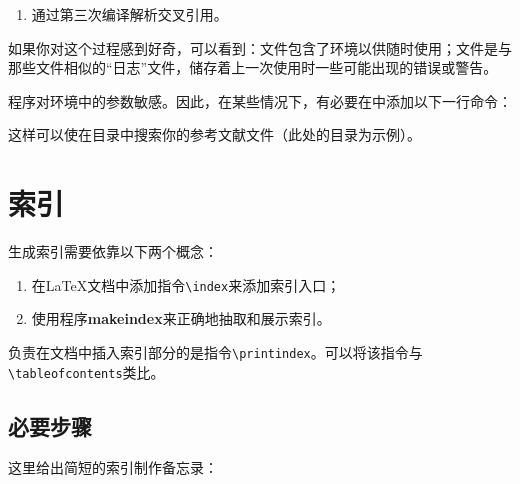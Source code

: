 \begin{enumerate}

    \item 通过第三次编译解析交叉引用。
\end{enumerate}

如果你对这个过程感到好奇，可以看到：文件包含了环境以供随时使用；文件是与那些文件相似的“日志”文件，储存着上一次使用\bib 时一些可能出现的错误或警告。

\begin{exclamation}
程序\bib 对环境中的参数敏感。因此，在某些情况下，有必要在\linebreak{}中添加以下一行命令：


这样可以使\bib 在目录中搜索你的参考文献文件（此处的目录为示例）。
\end{exclamation}

\section{索引}

生成索引需要依靠以下两个概念：

\begin{enumerate}
    \item 在\LaTeX 文档中添加指令\verb|\index|来添加索引入口；
    \item 使用程序\textbf{makeindex}来正确地抽取和展示索引。
\end{enumerate}

负责在文档中插入索引部分的是指令\verb|\printindex|。可以将该指令与\verb|\tableofcontents|类比。

\subsection{必要步骤}

这里给出简短的索引制作备忘录：

